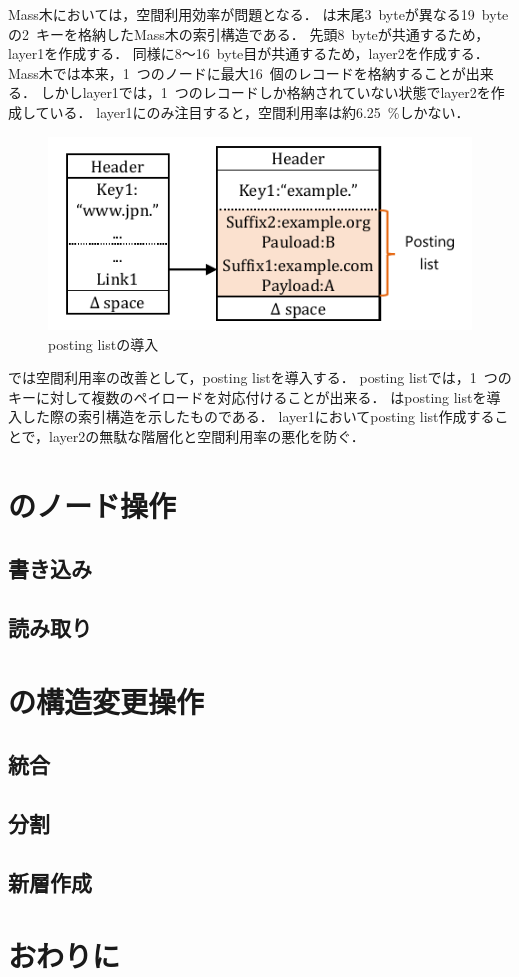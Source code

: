 Mass木においては，空間利用効率が問題となる．
\Fig{\ref{fig:memory}}は末尾3~byteが異なる19~byteの2~キーを格納したMass木の索引構造である．
先頭8~byteが共通するため，layer1を作成する．
同様に8～16~byte目が共通するため，layer2を作成する．
Mass木では本来，1~つのノードに最大16~個のレコードを格納することが出来る．
しかしlayer1では，1~つのレコードしか格納されていない状態でlayer2を作成している．
layer1にのみ注目すると，空間利用率は約6.25~\%しかない．

\begin{figure}[t]
    \centering
    \includegraphics{./figures/posting_list.pdf}
    \caption{posting listの導入}
    \label{fig:posting_list}
\end{figure}

\Bcforest{}では空間利用率の改善として，posting listを導入する．
posting listでは，1~つのキーに対して複数のペイロードを対応付けることが出来る．
\Fig{\ref{fig:posting_list}}はposting listを導入した際の索引構造を示したものである．
layer1においてposting list作成することで，layer2の無駄な階層化と空間利用率の悪化を防ぐ．


\section{\Bcforest{}のノード操作}
\label{sec:node_operation}

\subsection{書き込み}

\subsection{読み取り}

\section{\Bcforest{}の構造変更操作}
\label{sec:smo}

\subsection{統合}
\subsection{分割}
\subsection{新層作成}

\section{おわりに}
\label{sec:conclusion}

